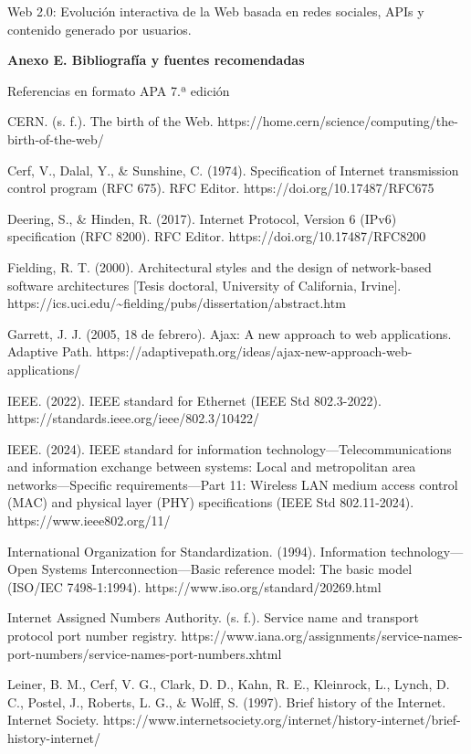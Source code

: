 Web 2.0: Evolución interactiva de la Web basada en redes sociales, APIs
y contenido generado por usuarios.

\textbf{Anexo E. Bibliografía y fuentes recomendadas}

Referencias en formato APA 7.ª edición

CERN. (s. f.). The birth of the Web.
https://home.cern/science/computing/the-birth-of-the-web/

Cerf, V., Dalal, Y., \& Sunshine, C. (1974). Specification of Internet
transmission control program (RFC 675). RFC Editor.
https://doi.org/10.17487/RFC675

Deering, S., \& Hinden, R. (2017). Internet Protocol, Version 6 (IPv6)
specification (RFC 8200). RFC Editor. https://doi.org/10.17487/RFC8200

Fielding, R. T. (2000). Architectural styles and the design of
network-based software architectures {[}Tesis doctoral, University of
California, Irvine{]}.
https://ics.uci.edu/\textasciitilde fielding/pubs/dissertation/abstract.htm

Garrett, J. J. (2005, 18 de febrero). Ajax: A new approach to web
applications. Adaptive Path.
https://adaptivepath.org/ideas/ajax-new-approach-web-applications/

IEEE. (2022). IEEE standard for Ethernet (IEEE Std 802.3-2022).
https://standards.ieee.org/ieee/802.3/10422/

IEEE. (2024). IEEE standard for information
technology---Telecommunications and information exchange between
systems: Local and metropolitan area networks---Specific
requirements---Part 11: Wireless LAN medium access control (MAC) and
physical layer (PHY) specifications (IEEE Std 802.11-2024).
https://www.ieee802.org/11/

International Organization for Standardization. (1994). Information
technology---Open Systems Interconnection---Basic reference model: The
basic model (ISO/IEC 7498-1:1994).
https://www.iso.org/standard/20269.html

Internet Assigned Numbers Authority. (s. f.). Service name and transport
protocol port number registry.
https://www.iana.org/assignments/service-names-port-numbers/service-names-port-numbers.xhtml

Leiner, B. M., Cerf, V. G., Clark, D. D., Kahn, R. E., Kleinrock, L.,
Lynch, D. C., Postel, J., Roberts, L. G., \& Wolff, S. (1997). Brief
history of the Internet. Internet Society.
https://www.internetsociety.org/internet/history-internet/brief-history-internet/

